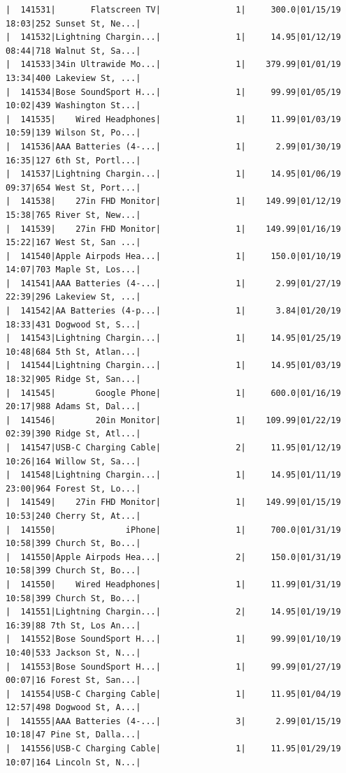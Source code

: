 \documentclass[
  letterpaper,
  DIV=11,
  numbers=noendperiod]{scrartcl}
\begin{document}
\begin{verbatim}
|  141531|       Flatscreen TV|               1|     300.0|01/15/19 18:03|252 Sunset St, Ne...|
|  141532|Lightning Chargin...|               1|     14.95|01/12/19 08:44|718 Walnut St, Sa...|
|  141533|34in Ultrawide Mo...|               1|    379.99|01/01/19 13:34|400 Lakeview St, ...|
|  141534|Bose SoundSport H...|               1|     99.99|01/05/19 10:02|439 Washington St...|
|  141535|    Wired Headphones|               1|     11.99|01/03/19 10:59|139 Wilson St, Po...|
|  141536|AAA Batteries (4-...|               1|      2.99|01/30/19 16:35|127 6th St, Portl...|
|  141537|Lightning Chargin...|               1|     14.95|01/06/19 09:37|654 West St, Port...|
|  141538|    27in FHD Monitor|               1|    149.99|01/12/19 15:38|765 River St, New...|
|  141539|    27in FHD Monitor|               1|    149.99|01/16/19 15:22|167 West St, San ...|
|  141540|Apple Airpods Hea...|               1|     150.0|01/10/19 14:07|703 Maple St, Los...|
|  141541|AAA Batteries (4-...|               1|      2.99|01/27/19 22:39|296 Lakeview St, ...|
|  141542|AA Batteries (4-p...|               1|      3.84|01/20/19 18:33|431 Dogwood St, S...|
|  141543|Lightning Chargin...|               1|     14.95|01/25/19 10:48|684 5th St, Atlan...|
|  141544|Lightning Chargin...|               1|     14.95|01/03/19 18:32|905 Ridge St, San...|
|  141545|        Google Phone|               1|     600.0|01/16/19 20:17|988 Adams St, Dal...|
|  141546|        20in Monitor|               1|    109.99|01/22/19 02:39|390 Ridge St, Atl...|
|  141547|USB-C Charging Cable|               2|     11.95|01/12/19 10:26|164 Willow St, Sa...|
|  141548|Lightning Chargin...|               1|     14.95|01/11/19 23:00|964 Forest St, Lo...|
|  141549|    27in FHD Monitor|               1|    149.99|01/15/19 10:53|240 Cherry St, At...|
|  141550|              iPhone|               1|     700.0|01/31/19 10:58|399 Church St, Bo...|
|  141550|Apple Airpods Hea...|               2|     150.0|01/31/19 10:58|399 Church St, Bo...|
|  141550|    Wired Headphones|               1|     11.99|01/31/19 10:58|399 Church St, Bo...|
|  141551|Lightning Chargin...|               2|     14.95|01/19/19 16:39|88 7th St, Los An...|
|  141552|Bose SoundSport H...|               1|     99.99|01/10/19 10:40|533 Jackson St, N...|
|  141553|Bose SoundSport H...|               1|     99.99|01/27/19 00:07|16 Forest St, San...|
|  141554|USB-C Charging Cable|               1|     11.95|01/04/19 12:57|498 Dogwood St, A...|
|  141555|AAA Batteries (4-...|               3|      2.99|01/15/19 10:18|47 Pine St, Dalla...|
|  141556|USB-C Charging Cable|               1|     11.95|01/29/19 10:07|164 Lincoln St, N...|

\end{verbatim}
\end{document}
